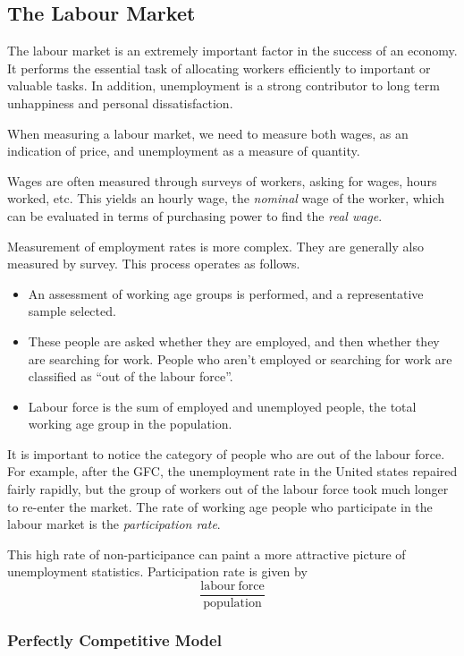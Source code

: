 \documentclass[12pt]{report}
\begin{document}
\begin{flushleft}
\subsection*{The Labour Market}

The labour market is an extremely important factor in the success of an 
economy. It performs the essential task of allocating workers efficiently
to important or valuable tasks. In addition, unemployment is a strong 
contributor to long term unhappiness and personal dissatisfaction. \par
When measuring a labour market, we need to measure both wages, as an indication
of price, and unemployment as a measure of quantity. \par
Wages are often measured through surveys of workers, asking for wages, hours
worked, etc. This yields an hourly wage, the \textit{nominal} wage of the 
worker, which can be evaluated in terms of purchasing power to find the 
\textit{real wage}.

\bigskip
Measurement of employment rates is more complex. They are generally also 
measured by survey. This process operates as follows.
\begin{itemize}
    \item An assessment of working age groups is performed, and a 
        representative sample selected.
    \item These people are asked whether they are employed, and then whether
        they are searching for work. People who aren't employed or searching
        for work are classified as ``out of the labour force''.
    \item Labour force is the sum of employed and unemployed people, the total
        working age group in the population.
\end{itemize}

It is important to notice the category of people who are out of the labour 
force. For example, after the GFC, the unemployment rate in the United states
repaired fairly rapidly, but the group of workers out of the labour force took
much longer to re-enter the market. The rate of working age people who 
participate in the labour market is the \textit{participation rate}. \par
This high rate of non-participance can paint a more attractive picture of
unemployment statistics. Participation rate is given by
\[\frac{\mathrm{labour\:force}}{\mathrm{population}}\]

\subsubsection*{Perfectly Competitive Model}


\end{flushleft}
\end{document}
